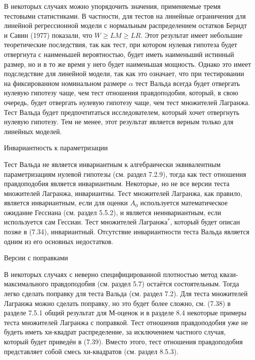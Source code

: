 В некоторых случаях можно упорядочить значения, применяемые тремя тестовыми статистиками. В частности, для тестов на линейные ограничения для линейной регрессионной модели с нормальным распределением остатков Берндт и Савин (1977) показали, что $W \geq LM \geq LR$. Этот результат имеет небольшие теоретические последствия, так как 
тест, при котором нулевая гипотеза будет отвергнута с наименьшей вероятностью, будет иметь наименьший истинный размер, но и в то же время у него будет наименьшая мощность. Однако это имеет подследствие для линейной модели, так как это означает, что при тестировании на фиксированном номинальном размере $\alpha$ тест Вальда всегда будет отвергать нулевую гипотезу чаще, чем тест отношения правдоподобия, который, в свою очередь, будет отвергать нулевую гипотезу чаще, чем тест множителей Лагранжа. Тест Вальда будет предпочтитаться исследователем, который хочет отвергнуть нулевую гипотезу. Тем не менее, этот результат является верным только для линейных моделей.

\begin{center}
Инвариантность к параметризации 
\end{center}

Тест Вальда не является инвариантным к алгебраически эквивалентным параметризациям нулевой гипотезы (см. раздел 7.2.9), тогда как тест отношения правдоподобия является инвариантным. Некоторые, но не все версии теста множителей Лагранжа, инвариантны. Тест множителей Лагранжа, как правило, является инвариантным, если для оценки $A_0$ используется математическое ожидание Гессиана (см. раздел 5.5.2), и является неинвариантным, если используется сам Гессиан. Тест множителей Лагранжа$^*$, который будет описан позже в (7.34), инвариантный. Отсутствие инвариантности теста Вальда является одним из его основных недостатков.

\begin{center}
Версии с поправками
\end{center}

В некоторых случаях с неверно специфицированной плотностью метод квази-максимального правдоподобия (см. раздел 5.7) остаётся состоятельным. Тогда легко сделать поправку для теста Вальда (см. раздел 7.2). Для теста множителей Лагранжа можно сделать поправку, но это будет более сложно, см. (7.38) в разделе 7.5.1 общий результат для М-оценок и в разделе 8.4 некоторые примеры теста множителей Лагранжа с поправкой. Тест отношения правдоподобия уже не будеть иметь хи-квадрат распределение, за исключением частного случая, который будет приведён в (7.39). Вместо этого, тест отношения правдоподобия представляет собой смесь хи-квадратов (см. раздел 8.5.3).

